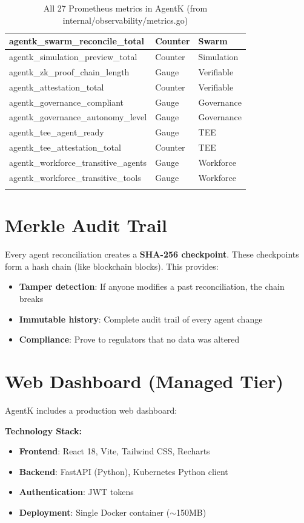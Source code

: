 \documentclass[12pt,a4paper,openany]{report}
\begin{document}
\begin{longtable}{p{6.5cm}p{3cm}p{3.5cm}}
agentk\_swarm\_reconcile\_total & Counter & Swarm \\
\midrule
agentk\_simulation\_preview\_total & Counter & Simulation \\
\midrule
agentk\_zk\_proof\_chain\_length & Gauge & Verifiable \\
agentk\_attestation\_total & Counter & Verifiable \\
agentk\_governance\_compliant & Gauge & Governance \\
agentk\_governance\_autonomy\_level & Gauge & Governance \\
\midrule
agentk\_tee\_agent\_ready & Gauge & TEE \\
agentk\_tee\_attestation\_total & Counter & TEE \\
\midrule
agentk\_workforce\_transitive\_agents & Gauge & Workforce \\
agentk\_workforce\_transitive\_tools & Gauge & Workforce \\
\bottomrule
\caption{All 27 Prometheus metrics in AgentK (from internal/observability/metrics.go)}
\end{longtable}

\section{Merkle Audit Trail}

Every agent reconciliation creates a \textbf{SHA-256 checkpoint}. These checkpoints form a hash chain (like blockchain blocks). This provides:
\begin{itemize}
    \item \textbf{Tamper detection}: If anyone modifies a past reconciliation, the chain breaks
    \item \textbf{Immutable history}: Complete audit trail of every agent change
    \item \textbf{Compliance}: Prove to regulators that no data was altered
\end{itemize}

\section{Web Dashboard (Managed Tier)}

AgentK includes a production web dashboard:

\textbf{Technology Stack:}
\begin{itemize}
    \item \textbf{Frontend}: React 18, Vite, Tailwind CSS, Recharts
    \item \textbf{Backend}: FastAPI (Python), Kubernetes Python client
    \item \textbf{Authentication}: JWT tokens
    \item \textbf{Deployment}: Single Docker container ($\sim$150MB)
\end{itemize}
\end{document}

